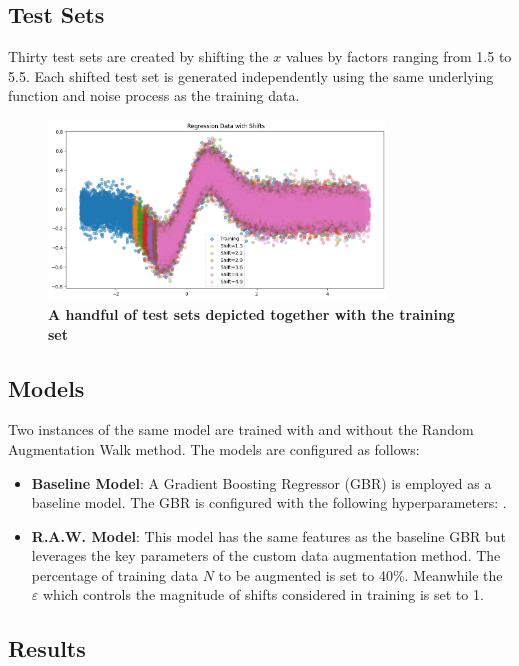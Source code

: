\subsection{Test Sets}
Thirty test sets are created by shifting the $x$ values by factors ranging from 1.5 to 5.5. Each shifted test set is generated independently using the same underlying function and noise process as the training data.
\begin{figure}[H]
    \centering
    \includegraphics[width=0.8\textwidth]{assets/reg_shift_plot.png} 
    \caption{\textbf{A handful of test sets depicted together with the training set}}
    \label{fig:reg-shift-plot}
\end{figure}

\subsection{Models}
Two instances of the same model are trained with and without the Random Augmentation Walk method. The models are configured as follows:
\begin{itemize}
    \item \textbf{Baseline Model}: A Gradient Boosting Regressor (GBR) is employed as a baseline model. The GBR is configured with the following hyperparameters: .
    \item \textbf{R.A.W. Model}: This model has the same features as the baseline GBR but leverages the key parameters of the custom data augmentation method. The percentage of training data $N$ to be augmented is set to 40\%. Meanwhile the $\varepsilon$ which controls the magnitude of shifts considered in training is set to 1.
\end{itemize}




\subsection{\textbf{Results}}

